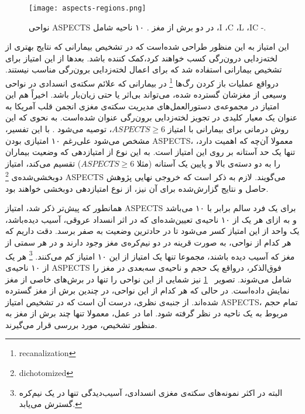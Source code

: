 \begin{figure}[ht]
\centering
\texttt{[image: aspects-regions.png]}
\caption[]{نواحی ASPECTS در دو برش از مغز \cite{kuang2019automated}. ۱۰ ناحیه شامل ،I ،C ،L ،IC -.}
\label{fig:aspects-regions}
\end{figure}


این امتیاز 
به این منظور طراحی شده‌است که 
در تشخیص بیمارانی که نتایج بهتری از لخته‌زدایی درون‌رگی
کسب خواهند کرد،‌کمک کننده باشد.
بعد‌ها از این امتیاز برای تشخیص بیمارانی استفاده شد که برای اعمال لخته‌زدایی برون‌رگی مناسب نیستند.
درواقع عملیات باز کردن رگ‌ها 
\footnote{recanalization}
در بیمارانی که علائم سکته‌ی انسدادی در نواحی وسیعی از مغزشان گسترده شده، می‌تواند بی‌اثر یا حتی زیان‌بار باشد.
اخیراً هم این امتیاز در
مجموعه‌ی دستور‌العمل‌های مدیریت سکته‌ی مغزی
انجمن قلب آمریکا به عنوان 
 یک معیار کلیدی در تجویز 
 لخته‌زدایی برون‌رگی عنوان شده‌است.
 به نحوی که این روش درمانی برای بیمارانی با امتیاز $ASPECTS\geq 6$، توصیه می‌شود \cite{mokin2017aspects}.
با این تفسیر، مشخص می‌شود علی‌رغم ۱۰ امتیازی بودن ASPECTS، معمولا آن‌چه که اهمیت دارد، تنها یک حد آستانه بر روی این امتیاز است.
به این نوع از امتیازدهی که وضعیت بیماران را به دو دسته‌ی بالا و پایین یک آستانه (مثلا $ASPECTS\geq6$) تقسیم می‌کند، امتیاز دوبخشی‌شده‌ی
\footnote{dichotomized}
ASPECTS می‌گویند.
لازم به ذکر است که خروجی نهایی پژوهش حاصل و نتایج گزارش‌شده برای آن نیز، از نوع امتیازدهی دو‌بخشی خواهند بود.


همانطور که پیش‌تر ذکر شد، امتیاز ASPECTS برای یک فرد سالم برابر با ۱۰ می‌باشد و به ازای هر یک از ۱۰ ناحیه‌ی تعیین‌شده‌ای که در اثر انسداد عروقی، آسیب دیده‌باشد، یک واحد از این امتیاز کسر می‌شود تا در حادترین وضعیت به صفر برسد.
دقت داریم که هر کدام از نواحی، به صورت قرینه در دو نیم‌کره‌ی مغز وجود دارند و در هر سمتی از مغز که آسیب دیده باشند، مجموعا تنها یک امتیاز از این ۱۰ امتیاز کم می‌کنند.
\footnote{البته در اکثر نمونه‌های سکته‌ی مغزی انسدادی، آسیب‌دیدگی تنها در یک نیم‌کره گسترش می‌یابد.}
هر یک از ۱۰ ناحیه‌ی ASPECTS فوق‌الذکر، درواقع یک حجم و ناحیه‌ی سه‌بعدی در مغز را شامل می‌شوند.
تصویر ~\ref{fig:aspects-regions} نیز شمایی از این نواحی را تنها در برش‌های خاصی از مغز نمایش داده‌است.
در حالی که هر کدام از این نواحی، در چندین برش از مغز گسترده شده‌اند.
از جنبه‌ی نظری، درست آن است که در تشخیص امتیاز ASPECTS، تمام حجم مربوط به یک ناحیه در نظر گرفته شود.
اما در عمل، معمولا تنها چند برش از مغز به منظور تشخیص، مورد بررسی قرار می‌گیرند.\\

